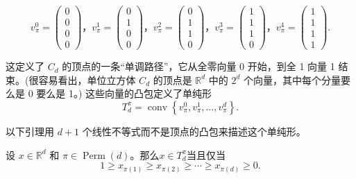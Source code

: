 \begin{equation}
{v}_{\pi }^{0} = \left( \begin{array}{l} 0 \\  0 \\  0 \\  0 \end{array}\right)，{v}_{\pi }^{1} = \left( \begin{array}{l} 0 \\  1 \\  0 \\  0 \end{array}\right)，{v}_{\pi }^{2} = \left( \begin{array}{l} 0 \\  1 \\  1 \\  0 \end{array}\right)，{v}_{\pi }^{3} = \left( \begin{array}{l} 1 \\  1 \\  1 \\  0 \end{array}\right)，{v}_{\pi }^{4} = \left( \begin{array}{l} 1 \\  1 \\  1 \\  1 \end{array}\right) .\label{eq:7.27}
\end{equation}

这定义了 \({C}_{d}\) 的顶点的一条“单调路径”，它从全零向量 0 开始，到全 1 向量 1 结束。(很容易看出，单位立方体 \({C}_{d}\) 的顶点是 \({\mathbb{R}}^{d}\) 中的 \({2}^{d}\) 个向量，其中每个分量要么是 0 要么是 1。) 这些向量的凸包定义了单纯形
\[
{T}_{d}^{\pi } = \operatorname{conv}\left\{  {{v}_{\pi }^{0},{v}_{\pi }^{1},\ldots,{v}_{\pi }^{d}}\right\}  .
\]

以下引理用 \(d + 1\) 个线性不等式而不是顶点的凸包来描述这个单纯形。

\begin{lemma}\label{lem:7.21}
设 \(x \in  {\mathbb{R}}^{d}\) 和 \(\pi  \in  \operatorname{Perm}\left( d\right)\)。那么$x \in T^{\pi}_d$当且仅当
\begin{equation}
1 \geq  {x}_{\pi \left( 1\right) } \geq  {x}_{\pi \left( 2\right) } \geq  \cdots  \geq  {x}_{\pi \left( d\right) } \geq  0.\label{eq:7.28}
\end{equation}
\end{lemma}



